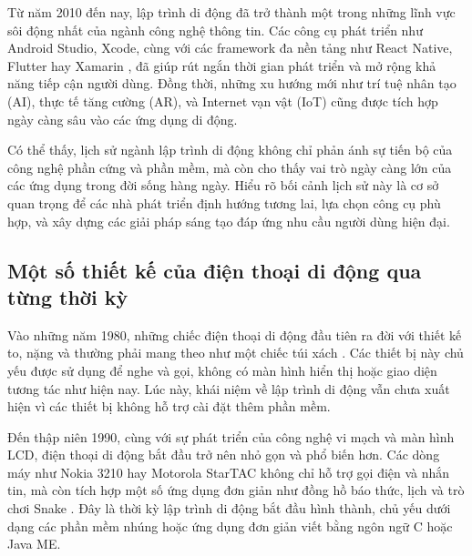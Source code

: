 \begin{flushleft}
  \hspace*{0.8cm}Từ năm 2010 đến nay, lập trình di động đã trở thành một trong những lĩnh vực sôi động nhất của ngành công nghệ thông tin. Các công cụ phát triển như Android Studio, Xcode, cùng với các framework đa nền tảng như React Native, Flutter hay Xamarin \cite{crossplatform}, đã giúp rút ngắn thời gian phát triển và mở rộng khả năng tiếp cận người dùng. Đồng thời, những xu hướng mới như trí tuệ nhân tạo (AI), thực tế tăng cường (AR), và Internet vạn vật (IoT) \cite{mobiletrends2020} cũng được tích hợp ngày càng sâu vào các ứng dụng di động.
\end{flushleft}

\begin{flushleft}
  \hspace*{0.8cm}Có thể thấy, lịch sử ngành lập trình di động không chỉ phản ánh sự tiến bộ của công nghệ phần cứng và phần mềm, mà còn cho thấy vai trò ngày càng lớn của các ứng dụng trong đời sống hàng ngày. Hiểu rõ bối cảnh lịch sử này là cơ sở quan trọng để các nhà phát triển định hướng tương lai, lựa chọn công cụ phù hợp, và xây dựng các giải pháp sáng tạo đáp ứng nhu cầu người dùng hiện đại.
\end{flushleft}

\subsection{Một số thiết kế của điện thoại di động qua từng thời kỳ}
\renewcommand{\labelitemi}{--}    
    \begin{flushleft}
        \hspace*{0.8cm}Vào những năm 1980, những chiếc điện thoại di động đầu tiên ra đời với thiết kế to, nặng và thường phải mang theo như một chiếc túi xách \cite{motorola1983}. Các thiết bị này chủ yếu được sử dụng để nghe và gọi, không có màn hình hiển thị hoặc giao diện tương tác như hiện nay. Lúc này, khái niệm về lập trình di động vẫn chưa xuất hiện vì các thiết bị không hỗ trợ cài đặt thêm phần mềm.
    \end{flushleft}

    \begin{flushleft}
      \hspace*{0.8cm}Đến thập niên 1990, cùng với sự phát triển của công nghệ vi mạch và màn hình LCD, điện thoại di động bắt đầu trở nên nhỏ gọn và phổ biến hơn. Các dòng máy như Nokia 3210 hay Motorola StarTAC không chỉ hỗ trợ gọi điện và nhắn tin, mà còn tích hợp một số ứng dụng đơn giản như đồng hồ báo thức, lịch và trò chơi Snake \cite{nokia3210}. Đây là thời kỳ lập trình di động bắt đầu hình thành, chủ yếu dưới dạng các phần mềm nhúng hoặc ứng dụng đơn giản viết bằng ngôn ngữ C hoặc Java ME.
  \end{flushleft}

